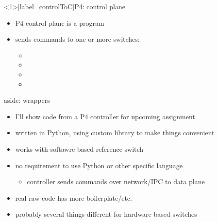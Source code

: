 
\begin{frame}<1>[label=controlToC]{P4: control plane}
    \begin{itemize}
    \item P4 control plane is a program
    \vspace{.5cm}
    \item sends commands to one or more switches:
        \begin{itemize}
        \item {}
        \item {}
        \item {}
        \item {}
        \end{itemize}
    \end{itemize}
\end{frame}

\begin{frame}{aside: wrappers}
    \begin{itemize}
    \item I'll show code from a P4 controller for upcoming assignment
    \item written in Python, using custom library to make things convenient
    \item works with softawre based reference switch
    \vspace{.5cm}
    \item no requirement to use Python or other specific language
        \begin{itemize}
        \item controller sends commands over network/IPC to data plane
        \end{itemize}
    \item real raw code has more boilerplate/etc.
    \item probably several things different for hardware-based switches
    \end{itemize}
\end{frame}


